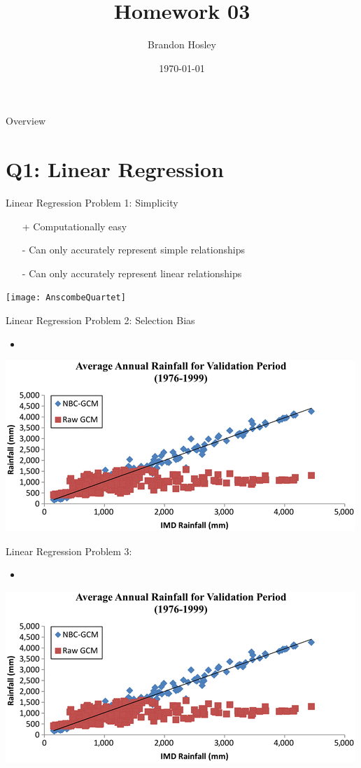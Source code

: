 \documentclass{beamer}
\title{Homework 03}
\author{Brandon Hosley}
\institute{University of Illinois - Springfield}
\date{\today}
\begin{document}
\frame{\titlepage}

\begin{frame}{Overview}
\tableofcontents
\end{frame}

\section[Q1]{Q1: Linear Regression}

\begin{frame}{Linear Regression Problem 1: Simplicity}
	\begin{itemize}
		\item[+] Computationally easy
		\item[-] Can only accurately represent simple relationships
		\item[-] Can only accurately represent linear relationships
	\end{itemize}
	\texttt{[image: AnscombeQuartet]}
\end{frame}

\begin{frame}{Linear Regression Problem 2: Selection Bias}
	\begin{itemize}
		\item
	\end{itemize}
	\includegraphics[width=0.75\linewidth]{SelectionBias}
\end{frame}

\begin{frame}{Linear Regression Problem 3: }
	\begin{itemize}
		\item
	\end{itemize}
	\includegraphics[width=0.75\linewidth]{SelectionBias}
\end{frame}
\end{document}
